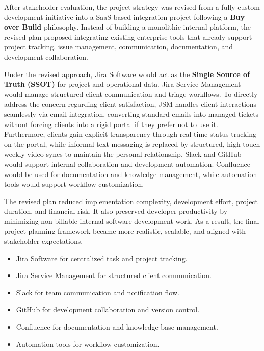 \documentclass[12pt,a4paper]{report}
\begin{document}
After stakeholder evaluation, the project strategy was revised from a fully custom development initiative into a SaaS-based integration project following a \textbf{Buy over Build} philosophy. Instead of building a monolithic internal platform, the revised plan proposed integrating existing enterprise tools that already support project tracking, issue management, communication, documentation, and development collaboration.

Under the revised approach, Jira Software would act as the \textbf{Single Source of Truth (SSOT)} for project and operational data. Jira Service Management would manage structured client communication and triage workflows. To directly address the concern regarding client satisfaction, JSM handles client interactions seamlessly via email integration, converting standard emails into managed tickets without forcing clients into a rigid portal if they prefer not to use it. Furthermore, clients gain explicit transparency through real-time status tracking on the portal, while informal text messaging is replaced by structured, high-touch weekly video syncs to maintain the personal relationship. Slack and GitHub would support internal collaboration and development automation. Confluence would be used for documentation and knowledge management, while automation tools would support workflow customization.

The revised plan reduced implementation complexity, development effort, project duration, and financial risk. It also preserved developer productivity by minimizing non-billable internal software development work. As a result, the final project planning framework became more realistic, scalable, and aligned with stakeholder expectations.

\begin{itemize}[leftmargin=*]
    \item Jira Software for centralized task and project tracking.
    \item Jira Service Management for structured client communication.
    \item Slack for team communication and notification flow.
    \item GitHub for development collaboration and version control.
    \item Confluence for documentation and knowledge base management.
    \item Automation tools for workflow customization.
\end{itemize}
\end{document}
